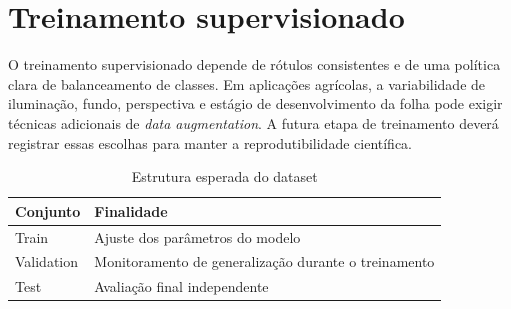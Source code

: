\section{Treinamento supervisionado}

O treinamento supervisionado depende de rótulos consistentes e de uma política clara de balanceamento de classes. Em aplicações agrícolas, a variabilidade de iluminação, fundo, perspectiva e estágio de desenvolvimento da folha pode exigir técnicas adicionais de \textit{data augmentation}. A futura etapa de treinamento deverá registrar essas escolhas para manter a reprodutibilidade científica.

\begin{table}[H]
    \centering
    \caption{Estrutura esperada do dataset}
    \label{tab:dataset-estrutura}
    \begin{tabular}{p{3cm}p{9cm}}
        \toprule
        \textbf{Conjunto} & \textbf{Finalidade} \\
        \midrule
        Train & Ajuste dos parâmetros do modelo \\
        Validation & Monitoramento de generalização durante o treinamento \\
        Test & Avaliação final independente \\
        \bottomrule
    \end{tabular}
\end{table}
